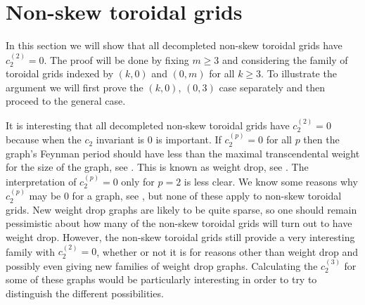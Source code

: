 \documentclass[12pt]{amsart}
\numberwithin{definition}{section}
\begin{document}
\section{Non-skew toroidal grids}
In this section we will show that all decompleted non-skew toroidal grids have $c_2^{(2)} = 0$.  The proof will be done by fixing $m\geq 3$ and considering the family of toroidal grids indexed by $(k, 0)$ and $(0, m)$ for all $k\geq 3$.  To illustrate the argument we will first prove the $(k, 0)$, $(0, 3)$ case separately and then proceed to the general case.

It is interesting that all decompleted non-skew toroidal grids have $c_2^{(2)}=0$ because when the $c_2$ invariant is $0$ is important.  If $c_2^{(p)} =0$ for all $p$ then the graph's Feynman period should have less than the maximal transcendental weight for the size of the graph, see \cite{Schnetz2011}.  This is known as weight drop, see \cite{BrownYeats2011}. The interpretation of $c_2^{(p)}=0$ only for $p=2$ is less clear.   We know some reasons why $c_2^{(p)}$ may be 0 for a graph, see \cite{ BrownSchnetz2012, BrownSchnetzYeats2014}, but none of these apply to non-skew toroidal grids.  New weight drop graphs are likely to be quite sparse, so one should remain pessimistic about how many of the non-skew toroidal grids will turn out to have weight drop.  However, the non-skew toroidal grids still provide a very interesting family with $c_2^{(2)}=0$, whether or not it is for reasons other than weight drop and possibly even giving new families of weight drop graphs.  Calculating the $c_2^{(3)}$ for some of these graphs would be particularly interesting in order to try to distinguish the different possibilities.
\end{document}
